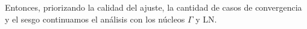 Entonces, priorizando la calidad del ajuste, la cantidad de casos de convergencia y el sesgo continuamos el análisis con los núcleos $\Gamma$ y LN.




